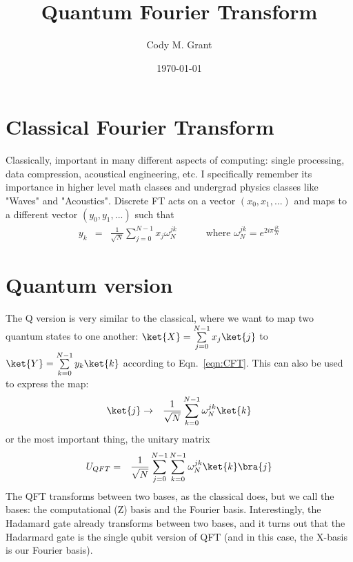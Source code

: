 \documentclass[preprint,aps,prd,nofootinbib,superscriptaddress]{revtex4-2}
\begin{document}
\title{\boldmath Quantum Fourier Transform}


\author{Cody M. Grant}


\date{\today}

%
\maketitle
\newpage

\section{Classical Fourier Transform}
%
Classically, important in many different aspects of computing: single processing, data compression, acoustical engineering, etc. I specifically remember its importance in higher level math classes and undergrad physics classes like "Waves" and "Acoustics". Discrete FT acts on a vector $(x_0, x_1,...)$ and maps to a different vector $(y_0, y_1,...)$ such that
%
\begin{eqnarray} \label{eqn:CFT}
y_k &=& \frac{1}{\sqrt{N}} \sum \limits _{j=0} ^{N-1} x_j \omega_N^{jk} \quad \quad \quad \text{where } \omega_N^{jk} = e^{2 i \pi \frac{jk}{N}}
\end{eqnarray}
%

\section{Quantum version}
%
The Q version is very similar to the classical, where we want to map two quantum states to one another: $\ket{X}=\sum \limits _{j=0} ^{N-1} x_j \ket{j}$  to $\ket{Y}=\sum \limits _{k=0} ^{N-1} y_k \ket{k}$ according to Eqn.~\ref{eqn:CFT}. This can also be used to express the map:
%
\begin{eqnarray} 
\ket{j} &\rightarrow & \frac{1}{\sqrt{N}} \sum \limits _{k=0} ^{N-1} \omega_N^{jk} \ket{k}
\end{eqnarray}
%
or the most important thing, the unitary matrix
%
\begin{eqnarray}
U_{QFT} &=& \frac{1}{\sqrt{N}} \sum \limits _{j=0} ^{N-1} \sum \limits _{k=0} ^{N-1} \omega_N^{jk} \ket{k}\bra{j}
\end{eqnarray}
%
The QFT transforms between two bases, as the classical does, but we call the bases: the computational (Z) basis and the Fourier basis. Interestingly, the Hadamard gate already transforms between two bases, and it turns out that the Hadarmard gate is the single qubit version of QFT (and in this case, the X-basis is our Fourier basis).
%
\end{document}
